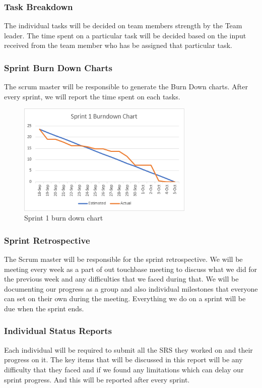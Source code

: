 \subsubsection{Task Breakdown}
The individual tasks will be decided on team members strength by the Team leader. The time spent on a particular task will be decided based on the input received from the team member who has be assigned that particular task.

\subsubsection{Sprint Burn Down Charts}
The scrum master will be responsible to generate the Burn Down charts. After every sprint, we will report the time spent on each tasks.

\begin{figure}[h!]
    \centering
    \includegraphics[width=0.75\textwidth]{images/burndown.png}
    \caption{Sprint 1 burn down chart}
\end{figure}

\subsubsection{Sprint Retrospective}
The Scrum master will be responsible for the sprint retrospective. We will be meeting every week as a part of out touchbase meeting to discuss what we did for the previous week and any difficulties that we faced during that. We will be documenting our progress as a group and also individual milestones that everyone can set on their own during the meeting. Everything we do on a sprint will be due when the sprint ends.

\subsubsection{Individual Status Reports}
Each individual will be required to submit all the SRS they worked on and their progress on it. The key items that will be discussed in this report will be any difficulty that they faced and if we found any limitations which can delay our sprint progress. And this will be reported after every sprint.

